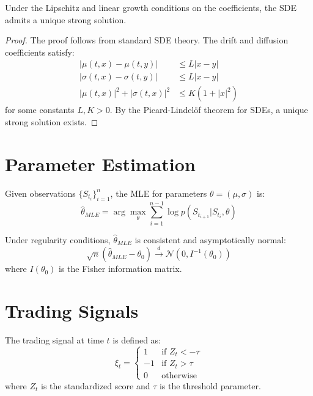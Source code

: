 \documentclass[12pt]{article}
\begin{document}
\begin{theorem}
Under the Lipschitz and linear growth conditions on the coefficients, the SDE admits a unique strong solution.
\end{theorem}

\begin{proof}
The proof follows from standard SDE theory. The drift and diffusion coefficients satisfy:
\begin{align}
|\mu(t,x) - \mu(t,y)| &\leq L|x-y| \\
|\sigma(t,x) - \sigma(t,y)| &\leq L|x-y| \\
|\mu(t,x)|^2 + |\sigma(t,x)|^2 &\leq K(1 + |x|^2)
\end{align}
for some constants $L, K > 0$. By the Picard-Lindelöf theorem for SDEs, a unique strong solution exists.
\end{proof}

\section{Parameter Estimation}

\begin{definition}
Given observations $\{S_{t_i}\}_{i=1}^n$, the MLE for parameters $\theta = (\mu, \sigma)$ is:
\begin{equation}
\hat{\theta}_{MLE} = \arg\max_{\theta} \sum_{i=1}^{n-1} \log p(S_{t_{i+1}} | S_{t_i}, \theta)
\end{equation}
\end{definition}

\begin{proposition}
Under regularity conditions, $\hat{\theta}_{MLE}$ is consistent and asymptotically normal:
\begin{equation}
\sqrt{n}(\hat{\theta}_{MLE} - \theta_0) \xrightarrow{d} \mathcal{N}(0, I^{-1}(\theta_0))
\end{equation}
where $I(\theta_0)$ is the Fisher information matrix.
\end{proposition}

\section{Trading Signals}

\begin{definition}
The trading signal at time $t$ is defined as:
\begin{equation}
\xi_t = \begin{cases}
1 & \text{if } Z_t < -\tau \\
-1 & \text{if } Z_t > \tau \\
0 & \text{otherwise}
\end{cases}
\end{equation}
where $Z_t$ is the standardized score and $\tau$ is the threshold parameter.
\end{definition}
\end{document}
